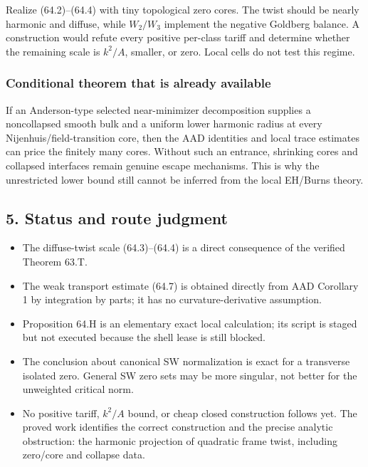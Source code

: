 \documentclass[
  10pt,
]{report}
\providecommand{\tightlist}{%
  \setlength{\itemsep}{0pt}\setlength{\parskip}{0pt}}
\begin{document}
Realize (64.2)--(64.4) with tiny topological zero cores. The twist
should be nearly harmonic and diffuse, while \(W_2/W_3\) implement the
negative Goldberg balance. A construction would refute every positive
per-class tariff and determine whether the remaining scale is \(k^2/A\),
smaller, or zero. Local cells do not test this regime.

\hypertarget{conditional-theorem-that-is-already-available}{%
\subsubsection{Conditional theorem that is already
available}\label{conditional-theorem-that-is-already-available}}

If an Anderson-type selected near-minimizer decomposition supplies a
noncollapsed smooth bulk and a uniform lower harmonic radius at every
Nijenhuis/field-transition core, then the AAD identities and local trace
estimates can price the finitely many cores. Without such an entrance,
shrinking cores and collapsed interfaces remain genuine escape
mechanisms. This is why the unrestricted lower bound still cannot be
inferred from the local EH/Burns theory.

\hypertarget{status-and-route-judgment}{%
\subsection{5. Status and route
judgment}\label{status-and-route-judgment}}

\begin{itemize}
\tightlist
\item
  The diffuse-twist scale (64.3)--(64.4) is a direct consequence of the
  verified Theorem 63.T.
\item
  The weak transport estimate (64.7) is obtained directly from AAD
  Corollary 1 by integration by parts; it has no curvature-derivative
  assumption.
\item
  Proposition 64.H is an elementary exact local calculation; its script
  is staged but not executed because the shell lease is still blocked.
\item
  The conclusion about canonical SW normalization is exact for a
  transverse isolated zero. General SW zero sets may be more singular,
  not better for the unweighted critical norm.
\item
  No positive tariff, \(k^2/A\) bound, or cheap closed construction
  follows yet. The proved work identifies the correct construction and
  the precise analytic obstruction: the harmonic projection of quadratic
  frame twist, including zero/core and collapse data.
\end{itemize}
\end{document}

